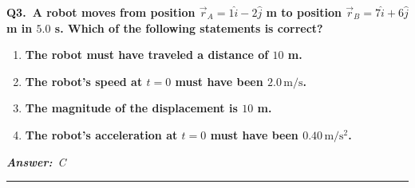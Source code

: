 \documentclass[11pt]{article}
\newcommand{\QuestionStyle}[1]{{\large\bfseries\boldmath #1}}
\newcommand{\AnswerStyle}[1]{{\large\bfseries\boldmath #1}}
\newcommand{\ReasonStyle}[1]{{\normalsize #1}}
\newif\ifshowreason
\newcommand{\Correct}[2]{%
  \item \AnswerStyle{\textcolor{AnsRed}{#1}}%
  \ifshowreason\\[-0.2em]
    \ReasonStyle{\textcolor{AnsRed}{#2}}%
  \fi
}
\newcommand{\Wrong}[2]{%
  \item \AnswerStyle{\textcolor{WrongBlue}{#1}}%
  \ifshowreason\\[-0.2em]
    \ReasonStyle{\textcolor{WrongBlue}{#2}}%
  \fi
}
\newcommand{\QBlock}[4]{%
  \Needspace{8\baselineskip}%
  \noindent
  \begin{minipage}{\linewidth}
    \QuestionStyle{#1.~#2}

    \vspace{0.25em}
    \begin{enumerate}
      #3
    \end{enumerate}

    \vspace{0.1em}
    \noindent\textcolor{AnsRed}{\textit{\textbf{Answer:}~#4}}

    \vspace{0.25em}
    \hrule height 0.4pt
  \end{minipage}
  \vspace{0.75em}
}
\begin{document}
\QBlock{Q3}{A robot moves from position \(\vec r_A = 1\hat i - 2\hat j\) m to position \(\vec r_B = 7\hat i + 6\hat j\) m in \(5.0\) s. Which of the following statements is correct?}{
\Wrong{The robot must have traveled a distance of \(10\) m.}{The value \(10\,\mathrm{m}\) is the magnitude of the displacement, not necessarily the path length traveled. The actual distance traveled depends on the path and cannot be determined from only the initial and final positions.}
\Wrong{The robot's speed at \(t=0\) must have been \(2.0\,\mathrm{m/s}\).}{This comes from dividing displacement magnitude by elapsed time and interpreting that as the initial speed. Endpoint positions over a time interval do not uniquely determine the speed at the starting instant.}
\Correct{The magnitude of the displacement is \(10\) m.}{The displacement is \(\Delta\vec r=\vec r_B-\vec r_A=(7-1)\hat i + \big(6-(-2)\big)\hat j = 6\hat i+8\hat j\,\mathrm{m}\). Its magnitude is \(|\Delta\vec r|=\sqrt{6^2+8^2}=\sqrt{100}=10\,\mathrm{m}\), so this is the only statement that must be true.}
\Wrong{The robot's acceleration at \(t=0\) must have been \(0.40\,\mathrm{m/s^2}\).}{This incorrectly assumes acceleration can be inferred from displacement and total time alone. Without more information about the motion or velocity, the initial acceleration is not determined.}
}{C}
\end{document}
